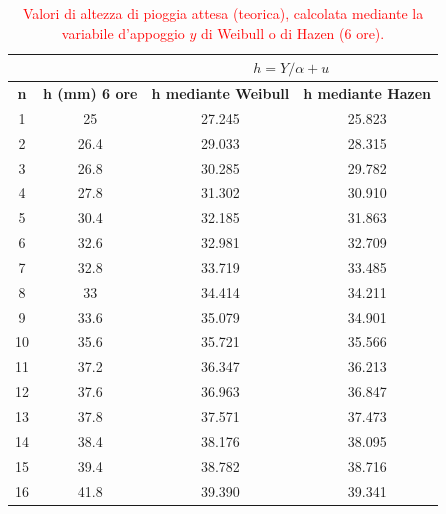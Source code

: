 \begin{table}[H] \centering
    \caption{\textcolor{red}{Valori di altezza di pioggia attesa (teorica), calcolata mediante la variabile d'appoggio $y$ di Weibull o di Hazen (6 ore).}}
    \begin{tabular}{cccc}
 & & \multicolumn{2}{c}{$h = Y/\alpha + u$}       \\
 \toprule
    \textbf{n} & \textbf{h (mm)  6 ore} & \textbf{h mediante Weibull} & \textbf{h mediante Hazen} \\
\midrule
    1          & 25                          & 27.245                & 25.823                 \\
    2          & 26.4                        & 29.033                & 28.315                 \\
    3          & 26.8                        & 30.285                & 29.782                 \\
    4          & 27.8                        & 31.302                & 30.910                 \\
    5          & 30.4                        & 32.185                & 31.863                 \\
    6          & 32.6                        & 32.981                & 32.709                 \\
    7          & 32.8                        & 33.719                & 33.485                 \\
    8          & 33                          & 34.414                & 34.211                 \\
    9          & 33.6                        & 35.079                & 34.901                 \\
    10         & 35.6                        & 35.721                & 35.566                 \\
    11         & 37.2                        & 36.347                & 36.213                 \\
    12         & 37.6                        & 36.963                & 36.847                 \\
    13         & 37.8                        & 37.571                & 37.473                 \\
    14         & 38.4                        & 38.176                & 38.095                 \\
    15         & 39.4                        & 38.782                & 38.716                 \\
    16         & 41.8                        & 39.390                & 39.341                 \\

\end{tabular}
\end{table}
